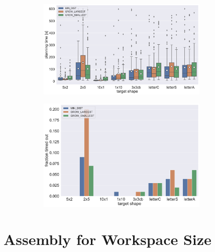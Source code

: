 \begin{figure}
	\centering
	\begin{subfigure}[b]{\textwidth}
		\centering
		\includegraphics[width=0.9\textwidth]{figures/plots/AFTS_time.pdf}
		\caption{}
		\label{fig:AFTS_time}
	\end{subfigure}
	
	\begin{subfigure}[b]{\textwidth}
		\centering
		\includegraphics[width=0.9\textwidth]{figures/plots/AFTS_timeout.pdf}
		\caption{}
		\label{fig:AFTS_timeout}
	\end{subfigure}
	\caption[]{}
	\label{fig:AFTS_timestats}
\end{figure}




\section{Assembly for Workspace Size}
\label{sec:AFBS}

